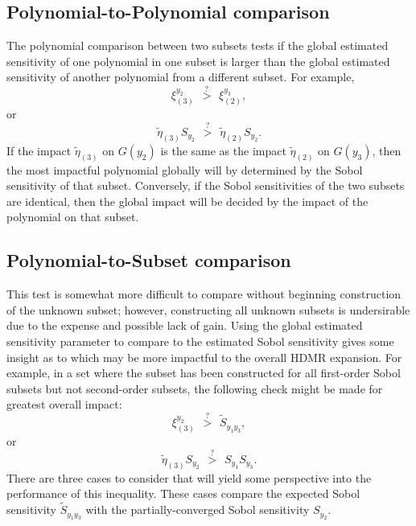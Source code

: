 \documentclass[11pt]{article}
\begin{document}
\subsection{Polynomial-to-Polynomial comparison}
The polynomial comparison between two subsets tests if the global estimated sensitivity of one polynomial in one subset is larger than the global estimated sensitivity of another polynomial from a different subset.  For example,
\begin{equation}
\xi_{(3)}^{y_2} \hspace{5pt}\stackrel{?}>\hspace{5pt} \xi_{(2)}^{y_3},
\end{equation}
or
\begin{equation}
\tilde\eta_{(3)} S_{y_2}\hspace{5pt}\stackrel{?}>\hspace{5pt} \tilde\eta_{(2)} S_{y_2}.
\end{equation}
If the impact $\tilde\eta_{(3)}$ on $G(y_2)$ is the same as the impact $\tilde\eta_{(2)}$ on $G(y_3)$, then the most impactful polynomial globally will by determined by the Sobol sensitivity of that subset.  Conversely, if the Sobol sensitivities of the two subsets are identical, then the global impact will be decided by the impact of the polynomial on that subset.
\subsection{Polynomial-to-Subset comparison}
This test is somewhat more difficult to compare without beginning construction of the unknown subset; however, constructing all unknown subsets is undersirable due to the expense and possible lack of gain.  Using the global estimated sensitivity parameter to compare to the estimated Sobol sensitivity gives some insight as to which may be more impactful to the overall HDMR expansion.  For example, in a set where the subset has been constructed for all first-order Sobol subsets but not second-order subsets, the following check might be made for greatest overall impact:
\begin{equation}
\xi_{(3)}^{y_2} \hspace{5pt}\stackrel{?}>\hspace{5pt} \tilde S_{y_1y_3},
\end{equation}
or
\begin{equation}
\tilde\eta_{(3)} S_{y_2}\hspace{5pt}\stackrel{?}>\hspace{5pt} S_{y_1}S_{y_3}.
\end{equation}
There are three cases to consider that will yield some perspective into the performance of this inequality.  These cases compare the expected Sobol sensitivity $\tilde S_{y_1y_3}$ with the partially-converged Sobol sensitivity $S_{y_2}$.\\
\end{document}

